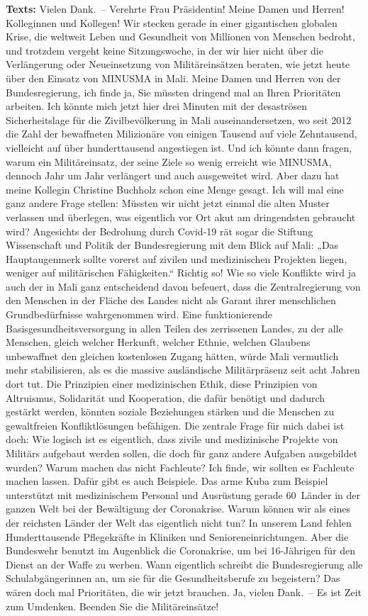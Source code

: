 \documentclass{article}
\begin{document}
\noindent\textbf{Texts:} Vielen Dank. – Verehrte Frau Präsidentin! Meine Damen und Herren! Kolleginnen und Kollegen! Wir stecken gerade in einer gigantischen globalen Krise, die weltweit Leben und Gesundheit von Millionen von Menschen bedroht, und trotzdem vergeht keine Sitzungswoche, in der wir hier nicht über die Verlängerung oder Neueinsetzung von Militäreinsätzen beraten, wie jetzt heute über den Einsatz von MINUSMA in Mali. Meine Damen und Herren von der Bundesregierung, ich finde ja, Sie müssten dringend mal an Ihren Prioritäten arbeiten. Ich könnte mich jetzt hier drei Minuten mit der desaströsen Sicherheitslage für die Zivilbevölkerung in Mali auseinandersetzen, wo seit 2012 die Zahl der bewaffneten Milizionäre von einigen Tausend auf viele Zehntausend, vielleicht auf über hunderttausend angestiegen ist. Und ich könnte dann fragen, warum ein Militäreinsatz, der seine Ziele so wenig erreicht wie MINUSMA, dennoch Jahr um Jahr verlängert und auch ausgeweitet wird. Aber dazu hat meine Kollegin Christine Buchholz schon eine Menge gesagt.  Ich will mal eine ganz andere Frage stellen: Müssten wir nicht jetzt einmal die alten Muster verlassen und überlegen, was eigentlich vor Ort akut am dringendsten gebraucht wird?  Angesichts der Bedrohung durch Covid‑19 rät sogar die Stiftung Wissenschaft und Politik der Bundesregierung mit dem Blick auf Mali: „Das Hauptaugenmerk sollte vorerst auf zivilen und medizinischen Projekten liegen, weniger auf militärischen Fähigkeiten.“ Richtig so!  Wie so viele Konflikte wird ja auch der in Mali ganz entscheidend davon befeuert, dass die Zentralregierung von den Menschen in der Fläche des Landes nicht als Garant ihrer menschlichen Grundbedürfnisse wahrgenommen wird. Eine funktionierende Basisgesundheitsversorgung in allen Teilen des zerrissenen Landes, zu der alle Menschen, gleich welcher Herkunft, welcher Ethnie, welchen Glaubens unbewaffnet den gleichen kostenlosen Zugang hätten, würde Mali vermutlich mehr stabilisieren, als es die massive ausländische Militärpräsenz seit acht Jahren dort tut.  Die Prinzipien einer medizinischen Ethik, diese Prinzipien von Altruismus, Solidarität und Kooperation, die dafür benötigt und dadurch gestärkt werden, könnten soziale Beziehungen stärken und die Menschen zu gewaltfreien Konfliktlösungen befähigen. Die zentrale Frage für mich dabei ist doch: Wie logisch ist es eigentlich, dass zivile und medizinische Projekte von Militärs aufgebaut werden sollen, die doch für ganz andere Aufgaben ausgebildet wurden? Warum machen das nicht Fachleute? Ich finde, wir sollten es Fachleute machen lassen.  Dafür gibt es auch Beispiele. Das arme Kuba zum Beispiel unterstützt mit medizinischem Personal und Ausrüstung gerade 60 Länder in der ganzen Welt bei der Bewältigung der Coronakrise. Warum können wir als eines der reichsten Länder der Welt das eigentlich nicht tun?  In unserem Land fehlen Hunderttausende Pflegekräfte in Kliniken und Senioreneinrichtungen. Aber die Bundeswehr benutzt im Augenblick die Coronakrise, um bei 16-Jährigen für den Dienst an der Waffe zu werben.  Wann eigentlich schreibt die Bundesregierung alle Schulabgängerinnen an, um sie für die Gesundheitsberufe zu begeistern? Das wären doch mal Prioritäten, die wir jetzt brauchen.  Ja, vielen Dank. – Es ist Zeit zum Umdenken. Beenden Sie die Militäreinsätze! 
\end{document}
